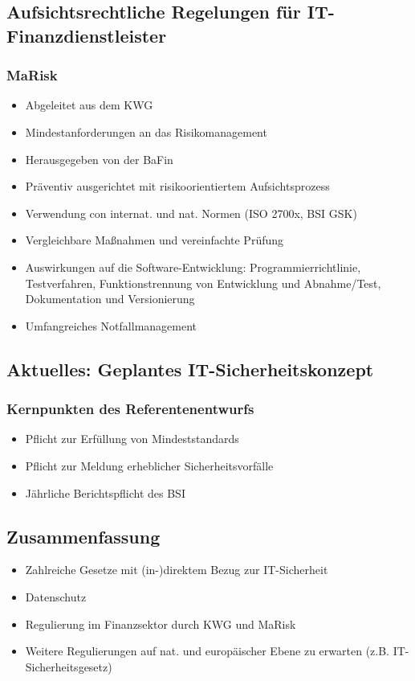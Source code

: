\subsection{Aufsichtsrechtliche Regelungen für IT-Finanzdienstleister}

\subsubsection{MaRisk}
\begin{itemize}
	\item Abgeleitet aus dem KWG
	\item Mindestanforderungen an das Risikomanagement
	\item Herausgegeben von der BaFin
	\item Präventiv ausgerichtet mit risikoorientiertem Aufsichtsprozess
	\item Verwendung con internat. und nat. Normen (ISO 2700x, BSI GSK)
	\item Vergleichbare Maßnahmen und vereinfachte Prüfung
	\item Auswirkungen auf die Software-Entwicklung: Programmierrichtlinie, Testverfahren, Funktionstrennung von Entwicklung und Abnahme/Test, Dokumentation und Versionierung
	\item Umfangreiches Notfallmanagement
\end{itemize}


\subsection{Aktuelles: Geplantes IT-Sicherheitskonzept}

\subsubsection{Kernpunkten des Referentenentwurfs}
\begin{itemize}
	\item Pflicht zur Erfüllung von Mindeststandards
	\item Pflicht zur Meldung erheblicher Sicherheitsvorfälle
	\item Jährliche Berichtspflicht des BSI
\end{itemize}


\subsection{Zusammenfassung}
\begin{itemize}
	\item Zahlreiche Gesetze mit (in-)direktem Bezug zur IT-Sicherheit
	\item Datenschutz
	\item Regulierung im Finanzsektor durch KWG und MaRisk
	\item Weitere Regulierungen auf nat. und europäischer Ebene zu erwarten (z.B. IT-Sicherheitsgesetz)
\end{itemize}

